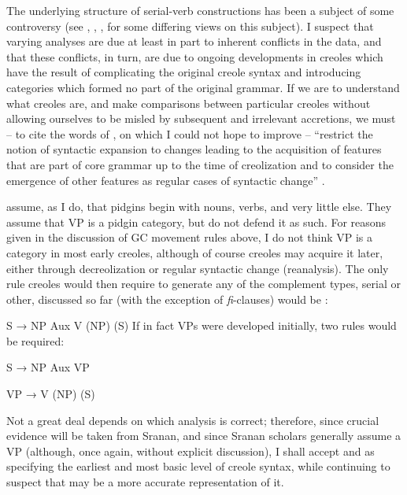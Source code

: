 The underlying structure of serial-verb constructions has been a subject of some controversy (see \citet{Williams1971,Williams1975}, \citet{Roberts1975}, \citet{Voorhoeve1975}, \citet{JansenEtAl1978} for some differing views on this subject). I suspect that varying analyses are due at least in part to inherent conflicts in the data, and that these conflicts, in turn, are due to ongoing developments in creoles which have the result of complicating the original creole syntax and intro\-ducing categories which formed no part of the original grammar. If we are to understand what creoles are, and make comparisons between particular creoles without allowing ourselves to be misled by sub\-sequent and irrelevant accretions, we must -- to cite the words of \citeauthor{KoopmanEtAl1981}, on which I could not hope to improve -- ``restrict the notion of syntactic expansion to changes leading to the acquisition of features that are part of core grammar up to the time of creolization and to consider the emergence of other features as regular cases of syntactic change'' \citep[218]{KoopmanEtAl1981}.

\citeauthor{KoopmanEtAl1981} assume, as I do, that pidgins begin with
nouns, verbs, and very little else. They assume that VP is a pidgin category, but do not defend it as such. For reasons given in the discussion of GC movement rules above, I do not think VP is a category in most early creoles, although of course creoles may acquire it later, either through decreolization or regular syntactic change (reanalysis). The only rule creoles would then require to generate any of the comple\-ment types, serial or other, discussed so far (with the exception of \textit{fi}-clauses) would be :

\ea\label{ex:2:236}
 S → NP Aux V (NP) (S)
\z
If in fact VPs were developed initially, two rules would be required:

\ea\label{ex:2:237}
S → NP Aux VP
\z

\ea\label{ex:2:238}
 VP → V (NP) (S)
\z

Not a great deal depends on which analysis is correct; therefore, since crucial evidence will be taken from Sranan, and since Sranan scholars generally assume a VP (although, once again, without explicit discussion), I shall accept  and  as specifying the earliest and most basic level of creole syntax, while continuing to suspect that  may be a more accurate representation of it.

